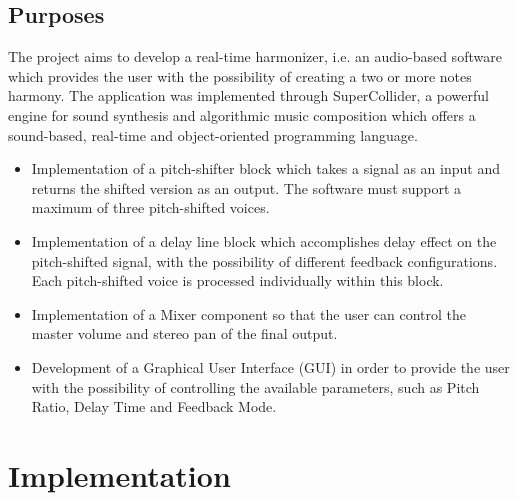 \documentclass{article}
\begin{document}
\subsection{Purposes}

The project aims to develop a real-time harmonizer, i.e. an audio-based software which provides the user with the possibility of creating a two or more notes harmony. The application was implemented through SuperCollider, a powerful engine for sound synthesis and algorithmic music composition which offers a sound-based, real-time and object-oriented programming language.
 \begin{itemize}
  \item Implementation of a pitch-shifter block which takes a signal as an input and returns the shifted version as an output. The software must support a maximum of three pitch-shifted voices.
  \item Implementation of a delay line block which accomplishes delay effect on the pitch-shifted signal, with the possibility of different feedback configurations. Each pitch-shifted voice is processed individually within this block.
  \item Implementation of a Mixer component so that the user can control the master volume and stereo pan of the final output.
  \item Development of a Graphical User Interface (GUI) in order to provide the user with the possibility of controlling the available parameters, such as Pitch Ratio, Delay Time and Feedback Mode.
\end{itemize}
 

\section{Implementation}
\end{document}
